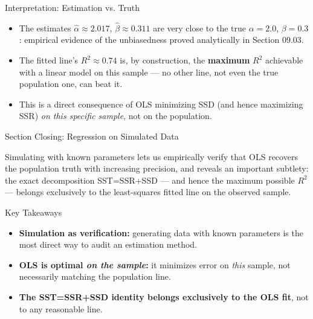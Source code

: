 \documentclass[10pt, aspectratio=169]{beamer}
\begin{document}
\begin{frame}{Interpretation: Estimation vs. Truth}
  \footnotesize
  \begin{itemize}\itemsep=0.12cm
    \item The estimates $\hat\alpha\approx2.017$, $\hat\beta\approx0.311$ are very close to the true $\alpha=2.0$, $\beta=0.3$: empirical evidence of the unbiasedness proved analytically in Section 09.03. \pause
    \item The fitted line's $R^2\approx0.74$ is, by construction, the \textbf{maximum} $R^2$ achievable with a linear model on this sample --- no other line, not even the true population one, can beat it. \pause
    \item This is a direct consequence of OLS minimizing SSD (and hence maximizing SSR) \emph{on this specific sample}, not on the population.
  \end{itemize}
\end{frame}

\begin{frame}{Section Closing: Regression on Simulated Data}
  \begin{reflexion}
    Simulating with known parameters lets us empirically verify that OLS recovers the population truth with increasing precision, and reveals an important subtlety: the exact decomposition SST=SSR+SSD --- and hence the maximum possible $R^2$ --- belongs exclusively to the least-squares fitted line on the observed sample.
  \end{reflexion}

  \vspace{0.2cm}
  \pause
  \begin{block}{Key Takeaways}
    \begin{itemize}\itemsep=0.08cm
      \item \textbf{Simulation as verification:} generating data with known parameters is the most direct way to audit an estimation method.
      \item \textbf{OLS is optimal \emph{on the sample}:} it minimizes error on \emph{this} sample, not necessarily matching the population line.
      \item \textbf{The SST=SSR+SSD identity belongs exclusively to the OLS fit}, not to any reasonable line.
    \end{itemize}
  \end{block}
\end{frame}
\end{document}
